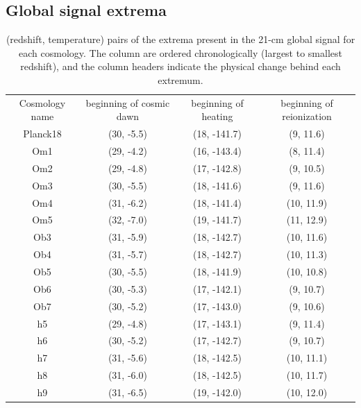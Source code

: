 \documentclass[floats,floatfix,showpacs,amssymb,prd,superscriptaddress,nofootinbib]{revtex4-2} %
\begin{document}
\begin{appendices}
\section{Global signal extrema}
\begin{table}[H]
    \centering
    \begin{tabular}{c c c c}
        \hline
        Cosmology name & beginning of cosmic dawn & beginning of heating & beginning of reionization \\ 
        \hhline{= = = =}
        Planck18 & (30, -5.5) & (18, -141.7) & (9, 11.6) \\ \hline
        Om1 & (29, -4.2) & (16, -143.4) & (8, 11.4) \\
        Om2 & (29, -4.8) & (17, -142.8) & (9, 10.5) \\
        Om3 & (30, -5.5) & (18, -141.6) & (9, 11.6) \\
        Om4 & (31, -6.2) & (18, -141.4) & (10, 11.9) \\
        Om5 & (32, -7.0) & (19, -141.7) & (11, 12.9) \\ \hline
        Ob3 & (31, -5.9) & (18, -142.7) & (10, 11.6) \\
        Ob4 & (31, -5.7) & (18, -142.7) & (10, 11.3) \\
        Ob5 & (30, -5.5) & (18, -141.9) & (10, 10.8) \\
        Ob6 & (30, -5.3) & (17, -142.1) & (9, 10.7) \\
        Ob7 & (30, -5.2) & (17, -143.0) & (9, 10.6) \\ \hline
        h5 & (29, -4.8) & (17, -143.1) & (9, 11.4) \\
        h6 & (30, -5.2) & (17, -142.7) & (9, 10.7) \\
        h7 & (31, -5.6) & (18, -142.5) & (10, 11.1) \\
        h8 & (31, -6.0) & (18, -142.5) & (10, 11.7) \\
        h9 & (31, -6.5) & (19, -142.0) & (10, 12.0) \\ \hline
    \end{tabular}
    \caption{(redshift, temperature) pairs of the extrema present in the 21-cm global signal for each cosmology. The column are ordered chronologically (largest to smallest redshift), and the column headers indicate the physical change behind each extremum.}
    \label{tab:global_signal_extrema}
\end{table}

\end{appendices}
\end{document}

